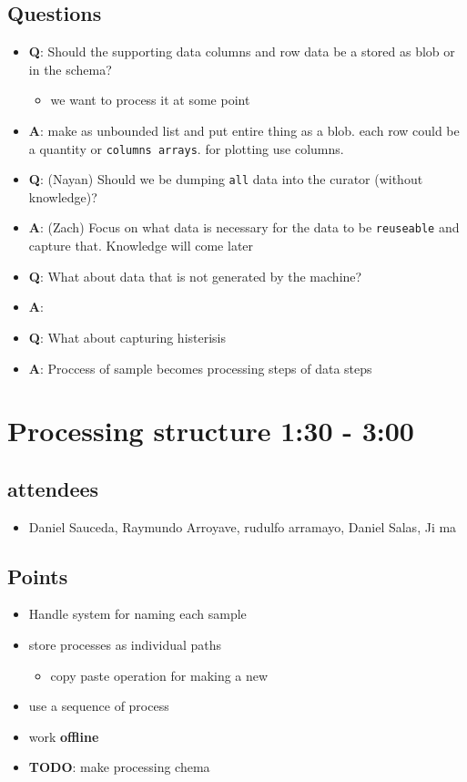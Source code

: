 \documentclass[11pt]{article}
\begin{document}
\subsection{Questions}
\label{sec:orgheadline6}
\begin{itemize}
\item \textbf{Q}: Should the supporting data columns and row data be a stored as blob or in the schema?
\begin{itemize}
\item we want to process it at some point
\end{itemize}
\item \textbf{A}: make as unbounded list and put entire thing as a blob. each row could be a quantity or \texttt{columns arrays}. for plotting use columns.
\item \textbf{Q}: (Nayan) Should we be dumping \texttt{all} data into the curator (without knowledge)?
\item \textbf{A}: (Zach) Focus on what data is necessary for the data to be \texttt{reuseable} and capture that. Knowledge will come later
\item \textbf{Q}: What about data that is not generated by the machine?
\item \textbf{A}:
\item \textbf{Q}: What about capturing histerisis
\item \textbf{A}: Proccess of sample becomes processing steps of data steps
\end{itemize}


\section{Processing structure 1:30 - 3:00}
\label{sec:orgheadline11}
\subsection{attendees}
\label{sec:orgheadline8}
\begin{itemize}
\item Daniel Sauceda, Raymundo Arroyave, rudulfo arramayo, Daniel Salas, Ji ma
\end{itemize}
\subsection{Points}
\label{sec:orgheadline9}
\begin{itemize}
\item Handle system for naming each sample
\item store processes as individual paths
\begin{itemize}
\item copy paste operation for making a new
\end{itemize}
\item use a sequence of process
\item work \textbf{offline}
\item \textbf{TODO}: make processing chema
\end{itemize}
\end{document}
